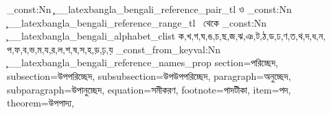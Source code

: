 
\tl_const:Nn \c__latexbangla_bengali_reference_pair_tl {ও}
\tl_const:Nn \c__latexbangla_bengali_reference_range_tl {~থেকে\nobreakspace}
\clist_const:Nn \c__latexbangla_bengali_alphabet_clist
  {ক,খ,গ,ঘ,ঙ,চ,ছ,জ,ঝ,ঞ,ট,ঠ,ড,ঢ,ণ,ত,থ,দ,ধ,ন,
   প,ফ,ব,ভ,ম,য,র,ল,শ,ষ,স,হ,ড়,ঢ়,য়}
\prop_const_from_keyval:Nn \c__latexbangla_bengali_reference_names_prop
  {
    section=পরিচ্ছেদ,
    subsection=উপপরিচ্ছেদ,
    subsubsection=উপউপপরিচ্ছেদ,
    paragraph=অনুচ্ছেদ,
    subparagraph=উপানুচ্ছেদ,
    equation=সমীকরণ,
    footnote=পাদটীকা,
    item=পদ,
    theorem=উপপাদ্য,
  }
\endinput
